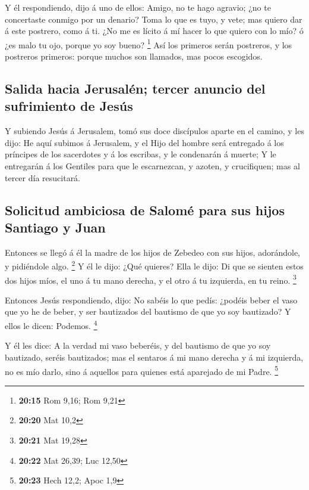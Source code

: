  Y él respondiendo, dijo á uno de ellos: Amigo, no te hago
agravio; ¿no te concertaste conmigo por un denario?  Toma
lo que es tuyo, y vete; mas quiero dar á este postrero, como á ti.
 ¿No me es lícito á mí hacer lo que quiero con lo mío? ó
¿es malo tu ojo, porque yo soy bueno? \footnote{\textbf{20:15} Rom 9,16;
  Rom 9,21}  Así los primeros serán postreros, y los
postreros primeros: porque muchos son llamados, mas pocos escogidos.

\hypertarget{salida-hacia-jerusaluxe9n-tercer-anuncio-del-sufrimiento-de-jesuxfas}{%
\subsection{Salida hacia Jerusalén; tercer anuncio del sufrimiento de
Jesús}\label{salida-hacia-jerusaluxe9n-tercer-anuncio-del-sufrimiento-de-jesuxfas}}

 Y subiendo Jesús á Jerusalem, tomó sus doce discípulos
aparte en el camino, y les dijo:  He aquí subimos á
Jerusalem, y el Hijo del hombre será entregado á los príncipes de los
sacerdotes y á los escribas, y le condenarán á muerte;  Y
le entregarán á los Gentiles para que le escarnezcan, y azoten, y
crucifiquen; mas al tercer día resucitará.

\hypertarget{solicitud-ambiciosa-de-salomuxe9-para-sus-hijos-santiago-y-juan}{%
\subsection{Solicitud ambiciosa de Salomé para sus hijos Santiago y
Juan}\label{solicitud-ambiciosa-de-salomuxe9-para-sus-hijos-santiago-y-juan}}

 Entonces se llegó á él la madre de los hijos de Zebedeo
con sus hijos, adorándole, y pidiéndole algo. \footnote{\textbf{20:20}
  Mat 10,2}  Y él le dijo: ¿Qué quieres? Ella le dijo: Di
que se sienten estos dos hijos míos, el uno á tu mano derecha, y el otro
á tu izquierda, en tu reino. \footnote{\textbf{20:21} Mat 19,28}

 Entonces Jesús respondiendo, dijo: No sabéis lo que pedís:
¿podéis beber el vaso que yo he de beber, y ser bautizados del bautismo
de que yo soy bautizado? Y ellos le dicen: Podemos. \footnote{\textbf{20:22}
  Mat 26,39; Luc 12,50}

 Y él les dice: A la verdad mi vaso beberéis, y del
bautismo de que yo soy bautizado, seréis bautizados; mas el sentaros á
mi mano derecha y á mi izquierda, no es mío darlo, sino á aquellos para
quienes está aparejado de mi Padre. \footnote{\textbf{20:23} Hech 12,2;
  Apoc 1,9}

